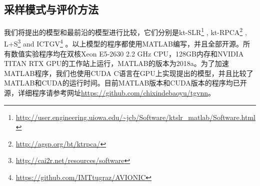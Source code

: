 \subsection{采样模式与评价方法}
我们将提出的模型和最前沿的模型进行比较，它们分别是kt-SLR\footnote{\url{http://user.engineering.uiowa.edu/~jcb/Software/ktslr_matlab/Software.html}} \cite{Sajan2011Accelerated}, kt-RPCA\footnote{\url{http://agsp.org/bt/ktrpca/}} \cite{tremoulheac}, L+S\footnote{\url{http://cai2r.net/resources/software}} \cite{lpluss} and ICTGV\footnote{\url{https://github.com/IMTtugraz/AVIONIC}} \cite{infimaltgv}。以上模型的程序都使用MATLAB编写，并且全部开源。所有数值实验程序均在双核Xeon E5-2630 2.2 GHz CPU，128GB内存和NVIDIA TITAN RTX GPU的工作站上运行，MATLAB的版本为2018a。为了加速MATLAB程序，我们也使用CUDA C语言在GPU上实现提出的模型，并且比较了MATLAB和CUDA的运行时间。目前MATLAB版本和CUDA版本的程序均已开源，详细程序请参考网址\url{https://github.com/chixindebaoyu/tgvnn}。

